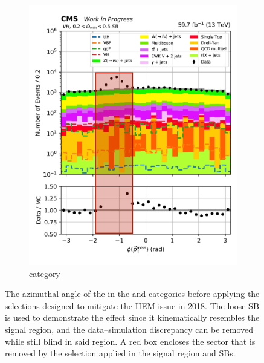 \begin{figure}[htbp]
\begin{subfigure}[b]{0.34\textwidth}
        \includegraphics[width=\textwidth]{figures/hem_issue/sideband_4/met_phi_VH_before_annotated.pdf}
        \caption{\VH category}
    \end{subfigure}
    \caption[The azimuthal angle of the \ptvecmiss in the \ttH and \VH categories before applying the selections designed to mitigate the HEM issue in 2018]{The azimuthal angle of the \ptvecmiss in the \ttH and \VH categories before applying the selections designed to mitigate the HEM issue in 2018. The loose \omegaTilde \gls{SB} is used to demonstrate the effect since it kinematically resembles the signal region, and the data--simulation discrepancy can be removed while still blind in said region. A red box encloses the sector that is removed by the selection applied in the signal region and \glspl{SB}.}
    \label{fig:htoinv_hem_issue_met_phi}
\end{figure}

